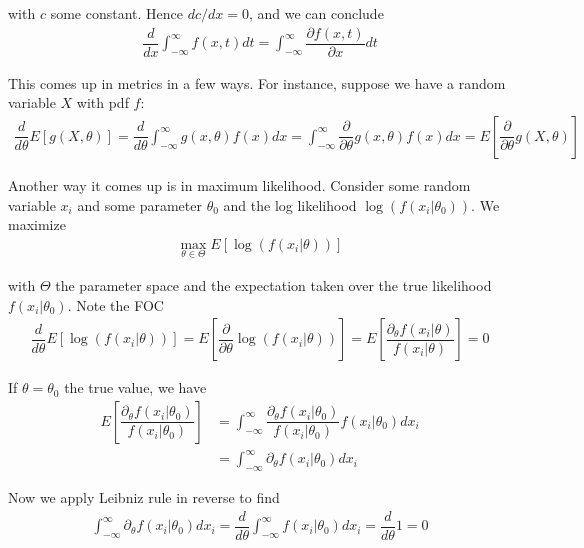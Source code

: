 \documentclass{article}
\begin{document}
\begin{enumerate}
\begin{remark}
    with $c$ some constant. Hence $dc/dx = 0$, and we can conclude
    \begin{align*}
      \dfrac{d}{dx} \int_{-\infty}^{\infty} f(x, t) dt
      =
      \int_{-\infty}^{\infty}
      \dfrac{\partial f(x, t)}{\partial x} dt
    \end{align*}

    This comes up in metrics in a few ways. For instance, suppose we have a random variable $X$ with pdf $f$:
    \begin{align*}
      \dfrac{d}{d\theta} E\left[g(X, \theta)\right]
      =
      \dfrac{d}{d\theta} \int_{-\infty}^{\infty} g(x, \theta) f(x) dx
      =
      \int_{-\infty}^{\infty} \dfrac{\partial}{\partial\theta} g(x, \theta) f(x) dx
      =
      E\left[
        \dfrac{\partial}{\partial\theta} g(X, \theta)
      \right]
    \end{align*}

    Another way it comes up is in maximum likelihood. Consider some random variable $x_i$ and some parameter $\theta_0$ and the log likelihood $\log(f(x_i | \theta_0))$. We maximize
    \begin{align*}
      \max_{\theta \in \Theta} E\left[\log(f(x_i | \theta))\right]
    \end{align*}

    with $\Theta$ the parameter space and the expectation taken over the true likelihood $f(x_i | \theta_0)$. Note the FOC
    \begin{align*}
      \dfrac{d}{d\theta} E\left[\log(f(x_i | \theta))\right]
      =
      E\left[\dfrac{\partial}{\partial\theta} \log(f(x_i | \theta))\right]
      =
      E\left[\dfrac{\partial_{\theta} f(x_i | \theta)}{f(x_i | \theta)}\right]
      =
      0
    \end{align*}

    If $\theta = \theta_0$ the true value, we have
    \begin{align*}
      E\left[\dfrac{\partial_{\theta} f(x_i | \theta_0)}{f(x_i | \theta_0)}\right]
      &
      =
      \int_{-\infty}^{\infty}
      \dfrac{\partial_{\theta} f(x_i | \theta_0)}{f(x_i | \theta_0)}
      f(x_i | \theta_0)
      dx_i
      \\
      &
      =
      \int_{-\infty}^{\infty}
      \partial_{\theta} f(x_i | \theta_0)
      dx_i
    \end{align*}

    Now we apply Leibniz rule in reverse to find
    \begin{align*}
      \int_{-\infty}^{\infty}
      \partial_{\theta} f(x_i | \theta_0)
      dx_i
      =
      \dfrac{d}{d\theta}
      \int_{-\infty}^{\infty}
      f(x_i | \theta_0)
      dx_i
      =
      \dfrac{d}{d\theta} 1
      =
      0
    \end{align*}


\end{remark}
\end{enumerate}
\end{document}
